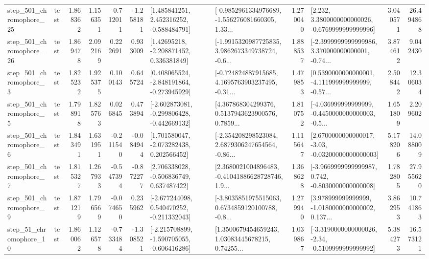 \begin{tabular}{llrrrrllrlrr}
  step\_501\_chromophore\_25 &      test &      1.868362 &    1.156351 &     -0.712011 & -1.258181 &    [1.485841251, 2.452316252, -0.588484791] &  [-0.9852961334976689, -1.556276081660305, 1.33... &       1.270040 &   [2.232, 3.3800000000000026, -0.6769999999999996] &            3.040571 &         26.494868 \\
  step\_501\_chromophore\_26 &      test &      1.869478 &    2.092169 &      0.222691 &  0.933009 &     [1.42695218, -2.208871452, 0.336381849] &  [-1.9915320987725835, 3.9862673349738724, -0.6... &       1.888537 &  [-2.3999999999999986, 3.370000000000001, -0.74... &            3.874612 &          9.042430 \\
   step\_501\_chromophore\_3 &      test &      1.825232 &    1.925375 &      0.100143 &  0.645724 &   [0.408065524, -2.848191864, -0.273945929] &  [-0.724824887915685, 4.1695763903237495, -0.31... &       1.479853 &  [0.5390000000000001, -4.111999999999999, -0.57... &            2.508442 &         12.306034 \\
   step\_501\_chromophore\_5 &      test &      1.798918 &    1.825763 &      0.026845 &  0.473894 &  [-2.602873081, -0.299806428, -0.442669132] &  [4.367868304299376, 0.5137943623900576, 0.7859... &       1.810752 &  [-4.036999999999999, -0.4450000000000003, -0.5... &            1.651809 &          2.209602 \\
   step\_501\_chromophore\_6 &      test &      1.843491 &    1.631951 &     -0.211540 & -0.084944 &    [1.701580047, -2.073282438, 0.202566452] &  [-2.354208298523084, 2.6879306247654564, -0.86... &       1.115647 &  [2.6700000000000017, -3.03, -0.03200000000000003] &            5.178206 &         14.088009 \\
   step\_501\_chromophore\_7 &      test &      1.815327 &    1.267933 &     -0.547394 & -0.872277 &    [2.706338028, -0.506836749, 0.637487422] &  [2.3680021004896483, -0.41041886628728746, 1.9... &       1.368628 &  [-3.9669999999999987, 0.742, -0.8030000000000008] &            1.782805 &         27.955620 \\
   step\_501\_chromophore\_9 &      test &      1.871219 &    1.796569 &     -0.074650 &  0.235962 &   [-2.677244098, 0.540470252, -0.211332043] &  [-3.8035851975515063, 0.6734859120100788, -0.8... &       1.279940 &  [3.978999999999999, -1.0180000000000002, 0.137... &            3.862953 &         10.741863 \\
   step\_51\_chromophore\_10 &      test &      1.860062 &    1.126578 &     -0.733484 & -1.308521 &  [-2.215708899, -1.590705055, -0.606416286] &  [1.3500679454659243, 1.03083445678215, 0.74255... &       1.039867 &  [-3.3190000000000026, -2.34, -0.5109999999999992] &            5.384273 &         16.573121 \\

\end{tabular}
